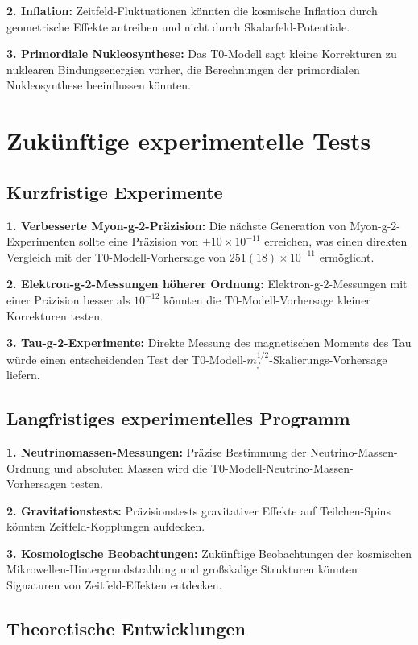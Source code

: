 \documentclass[12pt,a4paper]{article}
\begin{document}
\textbf{2. Inflation:}
Zeitfeld-Fluktuationen könnten die kosmische Inflation durch geometrische Effekte antreiben und nicht durch Skalarfeld-Potentiale.

\textbf{3. Primordiale Nukleosynthese:}
Das T0-Modell sagt kleine Korrekturen zu nuklearen Bindungsenergien vorher, die Berechnungen der primordialen Nukleosynthese beeinflussen könnten.

\section{Zukünftige experimentelle Tests}

\subsection{Kurzfristige Experimente}

\textbf{1. Verbesserte Myon-g-2-Präzision:}
Die nächste Generation von Myon-g-2-Experimenten sollte eine Präzision von $\pm 10 \times 10^{-11}$ erreichen, was einen direkten Vergleich mit der T0-Modell-Vorhersage von $251(18) \times 10^{-11}$ ermöglicht.

\textbf{2. Elektron-g-2-Messungen höherer Ordnung:}
Elektron-g-2-Messungen mit einer Präzision besser als $10^{-12}$ könnten die T0-Modell-Vorhersage kleiner Korrekturen testen.

\textbf{3. Tau-g-2-Experimente:}
Direkte Messung des magnetischen Moments des Tau würde einen entscheidenden Test der T0-Modell-$m_f^{1/2}$-Skalierungs-Vorhersage liefern.

\subsection{Langfristiges experimentelles Programm}

\textbf{1. Neutrinomassen-Messungen:}
Präzise Bestimmung der Neutrino-Massen-Ordnung und absoluten Massen wird die T0-Modell-Neutrino-Massen-Vorhersagen testen.

\textbf{2. Gravitationstests:}
Präzisionstests gravitativer Effekte auf Teilchen-Spins könnten Zeitfeld-Kopplungen aufdecken.

\textbf{3. Kosmologische Beobachtungen:}
Zukünftige Beobachtungen der kosmischen Mikrowellen-Hintergrundstrahlung und großskalige Strukturen könnten Signaturen von Zeitfeld-Effekten entdecken.

\subsection{Theoretische Entwicklungen}
\end{document}
